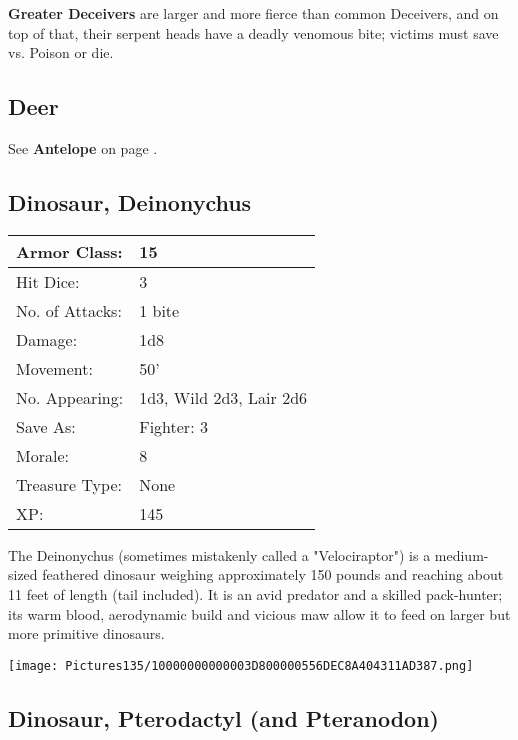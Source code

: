 \documentclass[a4paper,twoside,openany,10pt]{book}
\begin{document}
\begin{multicols}{2}
\textbf{Greater Deceivers} are larger and more fierce than common Deceivers,
and on top of that, their serpent heads have a deadly venomous bite;
victims must save vs. Poison or die.

\subsection*{Deer}\label{deer}

See \textbf{Antelope} on page \hyperlink{antelope}{\pageref{antelope}}.

\subsection*{Dinosaur, Deinonychus}\label{dinosaur-deinonychus}

\begin{tabularx}{0.48\textwidth}{@{}lX@{}}
Armor Class: & 15 \\\hline
Hit Dice: & 3 \\\hline
No. of Attacks: & 1 bite \\\hline
Damage: & 1d8 \\\hline
Movement: & 50' \\\hline
No. Appearing: & 1d3, Wild 2d3, Lair 2d6 \\\hline
Save As: & Fighter: 3 \\\hline
Morale: & 8 \\\hline
Treasure Type: & None \\\hline
XP: & 145 \\\hline
\end{tabularx}\medskip

The Deinonychus (sometimes mistakenly called a "Velociraptor") is a medium-sized feathered dinosaur weighing approximately 150 pounds and reaching about 11 feet of length (tail included). It is an avid predator and a skilled pack-hunter; its warm blood, aerodynamic build and vicious maw allow it to feed on larger but more primitive dinosaurs.

\begin{center}
	\texttt{[image: Pictures135/10000000000003D800000556DEC8A404311AD387.png]}
\end{center}

\subsection*{Dinosaur, Pterodactyl (and Pteranodon)}\label{dinosaur-pterodactyl-and-pteranodon}


\end{multicols}
\end{document}
